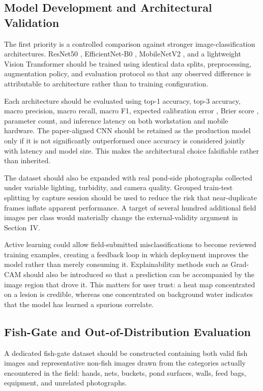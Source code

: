 \documentclass[conference]{IEEEtran}
\begin{document}
\subsection{Model Development and Architectural Validation}

The first priority is a controlled comparison against stronger image-classification architectures. ResNet50 \cite{b8}, EfficientNet-B0 \cite{b9}, MobileNetV2 \cite{b7}, and a lightweight Vision Transformer \cite{b10} should be trained using identical data splits, preprocessing, augmentation policy, and evaluation protocol so that any observed difference is attributable to architecture rather than to training configuration.

Each architecture should be evaluated using top-1 accuracy, top-3 accuracy, macro precision, macro recall, macro F1, expected calibration error \cite{b23}, Brier score \cite{b22}, parameter count, and inference latency on both workstation and mobile hardware. The paper-aligned CNN \cite{b1} should be retained as the production model only if it is not significantly outperformed once accuracy is considered jointly with latency and model size. This makes the architectural choice falsifiable rather than inherited.

The dataset \cite{b2} should also be expanded with real pond-side photographs collected under variable lighting, turbidity, and camera quality. Grouped train-test splitting by capture session should be used to reduce the risk that near-duplicate frames inflate apparent performance. A target of several hundred additional field images per class would materially change the external-validity argument in Section~IV.

Active learning \cite{b32} could allow field-submitted misclassifications to become reviewed training examples, creating a feedback loop in which deployment improves the model rather than merely consuming it. Explainability methods such as Grad-CAM \cite{b30} should also be introduced so that a prediction can be accompanied by the image region that drove it. This matters for user trust: a heat map concentrated on a lesion is credible, whereas one concentrated on background water indicates that the model has learned a spurious correlate.

\subsection{Fish-Gate and Out-of-Distribution Evaluation}

A dedicated fish-gate dataset should be constructed containing both valid fish images and representative non-fish images drawn from the categories actually encountered in the field: hands, nets, buckets, pond surfaces, walls, feed bags, equipment, and unrelated photographs.
\end{document}
